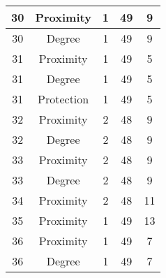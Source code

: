 \documentclass[results.tex]{subfiles}
\begin{document}
\begin{center}
\begin{tabular}{| c || c | c | c | c |}
            \hline
            30                      & Proximity                    & 1                      & 49                      & 9                    \\
            \hline
            30                      & Degree                       & 1                      & 49                      & 9                    \\
            \hline
            31                      & Proximity                    & 1                      & 49                      & 5                    \\
            \hline
            31                      & Degree                       & 1                      & 49                      & 5                    \\
            \hline
            31                      & Protection                   & 1                      & 49                      & 5                    \\
            \hline
            32                      & Proximity                    & 2                      & 48                      & 9                    \\
            \hline
            32                      & Degree                       & 2                      & 48                      & 9                    \\
            \hline
            33                      & Proximity                    & 2                      & 48                      & 9                    \\
            \hline
            33                      & Degree                       & 2                      & 48                      & 9                    \\
            \hline
            34                      & Proximity                    & 2                      & 48                      & 11                   \\
            \hline
            35                      & Proximity                    & 1                      & 49                      & 13                   \\
            \hline
            36                      & Proximity                    & 1                      & 49                      & 7                    \\
            \hline
            36                      & Degree                       & 1                      & 49                      & 7                    \\

\end{tabular}
\end{center}
\end{document}
